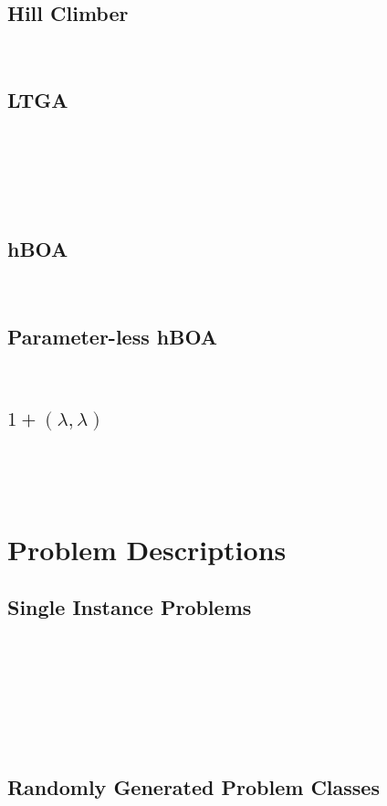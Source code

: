\documentclass[twoside]{article}
\begin{document}
~\cite{hornby:2006:alps}

~\cite{gronau:2007:upgma} %

\subsection{Hill Climber}
~\cite{goldman:2014:p3}

\subsection{LTGA}
~\cite{thierens:2010:ltga}

~\cite{thierens:2013:ltgahiff}

~\cite{bosman:2011:lsbbo} %

\subsection{hBOA}

~\cite{pelikan:2006:hboa}

\subsection{Parameter-less hBOA}
~\cite{pelikan:2004:parameterlesshboa}

\subsection{$1+(\lambda, \lambda)$}
~\cite{doerr:2013:lambdalambda}

~\cite{goldman:2014:p3}

\section{Problem Descriptions}
\subsection{Single Instance Problems}
~\cite{goldberg:1991:gasize} %

~\cite{goldman:2012:ltga} %

~\cite{thierens:2013:ltgahiff} %

~\cite{goldman:2014:p3} %

\subsection{Randomly Generated Problem Classes}
\end{document}
